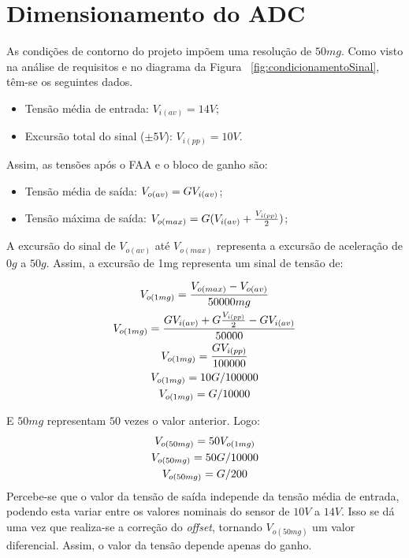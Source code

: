 \documentclass[11pt]{abntex2}
\begin{document}
			\section{Dimensionamento do ADC}
				
				As condições de contorno do projeto impõem uma resolução de $50mg$. Como
				visto na análise de requisitos e no diagrama da Figura ~\ref{fig:condicionamentoSinal},
				têm-se os seguintes dados.
				\begin{itemize}
					
					\item Tensão média de entrada: $V_{i(av)} = 14V$;
					\item Excursão total do sinal ($\pm5V$): $V_{i(pp)} = 10V$.
					
				\end{itemize}
				Assim, as tensões após o FAA e o bloco de ganho são:

				\begin{itemize}	
					\item Tensão média de saída: $V_{o(av)} = G\* V_{i(av)}$;
					\item Tensão máxima de saída: $V_{o(max)} = G\* (V_{i(av)} + \frac{V_{i(pp)}}{2})$;
				\end{itemize}	
					

				A excursão do sinal de $V_{o(av)}$ até $V_{o(max)}$ representa a excursão de aceleração
				de $0g$ a $50g$. Assim, a excursão de 1mg representa um sinal de tensão de:

				\begin{gather*}
					V_{o(1mg)} = \frac{V_{o(max)} - V_{o(av)}}{50000mg}\\
					V_{o(1mg)} = \frac{G\*V_{i(av)} + G\*\frac{V_{i(pp)}}{2} - G\*V_{i(av)}}{50000}\\
					V_{o(1mg)} = \frac{G\*V_{i(pp)}}{100000}\\
					V_{o(1mg)} = 10\*G/100000\\
					V_{o(1mg)} = G/10000
				\end{gather*}
				
				E $50mg$ representam $50$ vezes o valor anterior. Logo:
				\begin{gather*}
					V_{o(50mg)} =50\*V_{o(1mg)}\\
					V_{o(50mg)} =50\*G/10000\\
					V_{o(50mg)} =G/200
				\end{gather*}
				Percebe-se que o valor da tensão de saída independe da tensão média
				de entrada, podendo esta variar entre os valores nominais do sensor
				de $10V$ a $14V$. Isso se dá uma vez que realiza-se a correção do
				\textit{offset}, tornando $V_{o(50mg)}$ um valor diferencial. Assim,
				o valor da tensão depende apenas do ganho.
				
\end{document}

